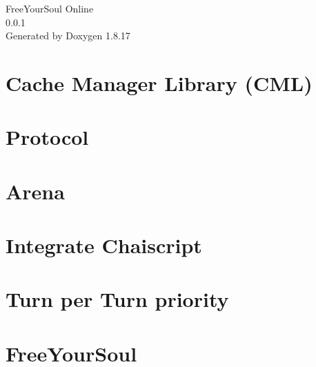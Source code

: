 \let\mypdfximage\pdfximage\def\pdfximage{\immediate\mypdfximage}\documentclass[twoside]{book}
\newcommand{\+}{\discretionary{\mbox{\scriptsize$\hookleftarrow$}}{}{}}
\newcommand{\clearemptydoublepage}{%
  \newpage{\pagestyle{empty}\cleardoublepage}%
}
\begin{document}
\hypersetup{pageanchor=false,
             bookmarksnumbered=true,
             pdfencoding=unicode
            }
\begin{titlepage}
\vspace*{7cm}
\begin{center}%
{\Large Free\+Your\+Soul Online \\[1ex]\large 0.\+0.\+1 }\\
\vspace*{1cm}
{\large Generated by Doxygen 1.8.17}\\
\end{center}
\end{titlepage}
\clearemptydoublepage
{}
\tableofcontents
\clearemptydoublepage
{}
\hypersetup{pageanchor=true}

\chapter{Cache Manager Library (C\+ML)}
\label{md__c_m_l}

\chapter{Protocol}
\label{md_code__protocol}

\chapter{Arena}
\label{md_services_arena__arena__battle_system}

\chapter{Integrate Chaiscript}
\label{md_services_arena__arena__integrate__chaiscripts}

\chapter{Turn per Turn priority}
\label{md_services_arena__arena__turn_priority_list}

\chapter{Free\+Your\+Soul}
\label{md__story_plot}

\end{document}
